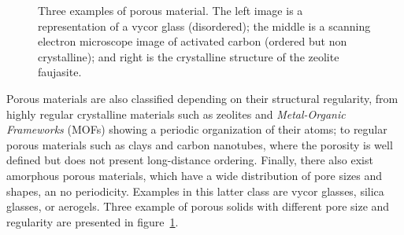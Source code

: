 \documentclass[thesis]{subfiles}
\begin{document}
\begin{figure}[ht]
    \centering
    \hfill
    \hfill
    \caption{Three examples of porous material. The left image is a
    representation of a vycor glass (disordered)\cite{Levitz2003}; the middle
    is a scanning electron microscope image of activated carbon (ordered but non
    crystalline)\cite{TODO}; and right is the crystalline structure of the
    zeolite faujasite.}
    \label{fig:porous-examples}
\end{figure}

Porous materials are also classified depending on their structural regularity,
from highly regular crystalline materials such as zeolites and
\emph{Metal-Organic Frameworks} (MOFs) showing a periodic organization of their
atoms; to regular porous materials such as clays and carbon nanotubes, where the
porosity is well defined but does not present long-distance ordering. Finally,
there also exist amorphous porous materials, which have a wide distribution of
pore sizes and shapes, an no periodicity. Examples in this latter class are
vycor glasses, silica glasses, or aerogels. Three example of porous solids with
different pore size and regularity are presented in
figure~\ref{fig:porous-examples}.
\end{document}
